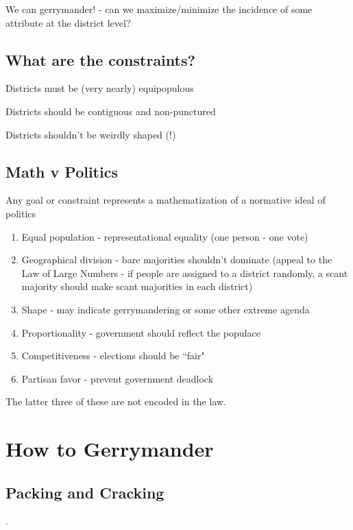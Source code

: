 We can gerrymander! - can we maximize/minimize the incidence of some attribute at the district level?

\subsection*{What are the constraints?}

Districts must be (very nearly) equipopulous

Districts should be contiguous and non-punctured

Districts shouldn't be weirdly shaped (!)

\subsection*{Math v Politics}

Any goal or constraint represents a mathematization of a normative ideal of politics

\begin{enumerate}
	\item[] Equal population - representational equality (one person - one vote)
	\item[] Geographical division - bare majorities shouldn't dominate (appeal to the Law of Large Numbers - if people are assigned to a district randomly, a scant majority should make scant majorities in each district)
	\item[] Shape - may indicate gerrymandering or some other extreme agenda
	\item[] Proportionality - government should reflect the populace
	\item[] Competitiveness - elections should be ``fair"
	\item[] Partisan favor - prevent government deadlock
\end{enumerate}

The latter three of these are not encoded in the law.

\section*{How to Gerrymander}

\subsection*{Packing and Cracking}

.

